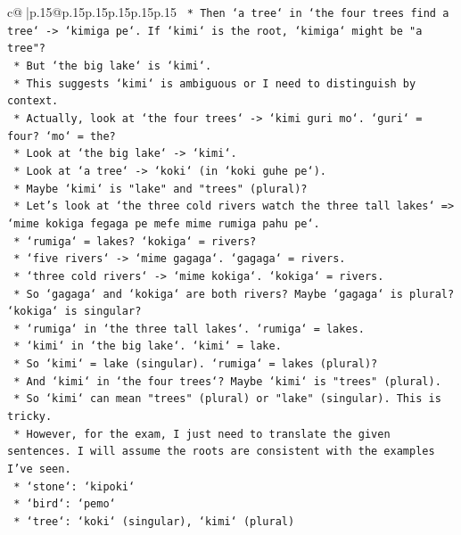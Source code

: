 \documentclass{article}
\begin{document}
{\begin{supertabular}{c@{$\;$}|p{.15\linewidth}@{}p{.15\linewidth}p{.15\linewidth}p{.15\linewidth}p{.15\linewidth}p{.15\linewidth}}
{{{\texttt{        *   Then `a tree` in `the four trees find a tree` {-}> `kimiga pe`. If `kimi` is the root, `kimiga` might be "a tree"?} \\
\texttt{        *   But `the big lake` is `kimi`.} \\
\texttt{        *   This suggests `kimi` is ambiguous or I need to distinguish by context.} \\
\texttt{        *   Actually, look at `the four trees` {-}> `kimi guri mo`. `guri` = four? `mo` = the?} \\
\texttt{        *   Look at `the big lake` {-}> `kimi`.} \\
\texttt{        *   Look at `a tree` {-}> `koki` (in `koki guhe pe`).} \\
\texttt{        *   Maybe `kimi` is "lake" and "trees" (plural)?} \\
\texttt{        *   Let's look at `the three cold rivers watch the three tall lakes` => `mime kokiga fegaga pe mefe mime rumiga pahu pe`.} \\
\texttt{        *   `rumiga` = lakes? `kokiga` = rivers?} \\
\texttt{        *   `five rivers` {-}> `mime gagaga`. `gagaga` = rivers.} \\
\texttt{        *   `three cold rivers` {-}> `mime kokiga`. `kokiga` = rivers.} \\
\texttt{        *   So `gagaga` and `kokiga` are both rivers? Maybe `gagaga` is plural? `kokiga` is singular?} \\
\texttt{        *   `rumiga` in `the three tall lakes`. `rumiga` = lakes.} \\
\texttt{        *   `kimi` in `the big lake`. `kimi` = lake.} \\
\texttt{        *   So `kimi` = lake (singular). `rumiga` = lakes (plural)?} \\
\texttt{        *   And `kimi` in `the four trees`? Maybe `kimi` is "trees" (plural).} \\
\texttt{        *   So `kimi` can mean "trees" (plural) or "lake" (singular). This is tricky.} \\
\texttt{        *   However, for the exam, I just need to translate the given sentences. I will assume the roots are consistent with the examples I've seen.} \\
\texttt{        *   `stone`: `kipoki`} \\
\texttt{        *   `bird`: `pemo`} \\
\texttt{        *   `tree`: `koki` (singular), `kimi` (plural)} \\
}}}
\end{supertabular}}
\end{document}
